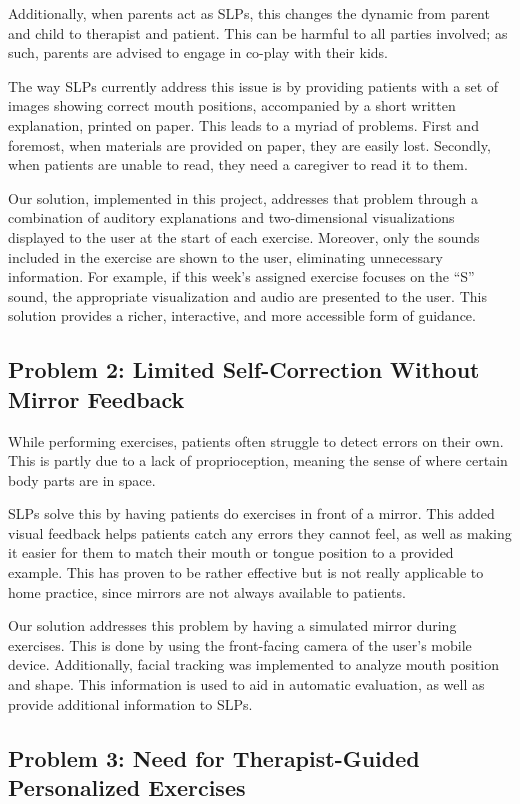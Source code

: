 Additionally, when parents act as SLPs, this changes the dynamic from parent and child to therapist and patient. This can be harmful to all parties involved; as such, parents are advised to engage in co-play with their kids.

The way SLPs currently address this issue is by providing patients with a set of images showing correct mouth positions, accompanied by a short written explanation, printed on paper. This leads to a myriad of problems. First and foremost, when materials are provided on paper, they are easily lost. Secondly, when patients are unable to read, they need a caregiver to read it to them.

Our solution, implemented in this project, addresses that problem through a combination of auditory explanations and two-dimensional visualizations displayed to the user at the start of each exercise. Moreover, only the sounds included in the exercise are shown to the user, eliminating unnecessary information. For example, if this week's assigned exercise focuses on the ``S'' sound, the appropriate visualization and audio are presented to the user. This solution provides a richer, interactive, and more accessible form of guidance.

\subsection{Problem 2: Limited Self-Correction Without Mirror Feedback}

While performing exercises, patients often struggle to detect errors on their own. This is partly due to a lack of proprioception, meaning the sense of where certain body parts are in space.

SLPs solve this by having patients do exercises in front of a mirror. This added visual feedback helps patients catch any errors they cannot feel, as well as making it easier for them to match their mouth or tongue position to a provided example. This has proven to be rather effective but is not really applicable to home practice, since mirrors are not always available to patients.

Our solution addresses this problem by having a simulated mirror during exercises. This is done by using the front-facing camera of the user's mobile device. Additionally, facial tracking was implemented to analyze mouth position and shape. This information is used to aid in automatic evaluation, as well as provide additional information to SLPs.

\subsection{Problem 3: Need for Therapist-Guided Personalized Exercises}

